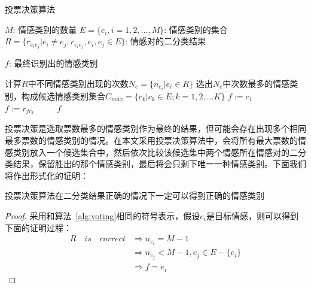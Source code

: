 \begin{algorithm}[H]
    \caption{投票决策算法}
    \label{alg:voting}
    
    \begin{algorithmic}[1]
        \Require %
            \Statex $M$: 情感类别的数量 
            \Statex $E = \{e_i, i=1,2,...,M\}$: 情感类别的集合
            \Statex $R = \{r_{e_ie_j}|e_i \neq e_j; r_{e_ie_j}, e_i, e_j \in E\}$: 情感对的二分类结果

        \Ensure %
            \Statex $f$: 最终识别出的情感类别

        \Statex
        \State  计算$R$中不同情感类别出现的次数$N_e = \{n_{e_i}|e_i \in R\}$ %
        \State  选出$N_e$中次数最多的情感类别，构成候选情感类别集合$C_{max} = \{c_k|c_k \in E; k = 1,2,...K\}$
        \State  $f := c_1$
                \State $f := r_{fc_k}$
            \EndFor
    　　 \EndIf
        \State \Return $f$
    \end{algorithmic}
\end{algorithm}

投票决策是选取票数最多的情感类别作为最终的结果，但可能会存在出现多个相同最多票数的情感类别的情况。在本文采用投票决策算法中，会将所有最大票数的情感类别放入一个候选集合中，然后依次比较该候选集中两个情感所在情感对的二分类结果，保留胜出的那个情感类别，最后将会只剩下唯一一种情感类别。下面我们将作出形式化的证明：

\begin{proposition}
    投票决策算法在二分类结果正确的情况下一定可以得到正确的情感类别
\end{proposition}
\begin{proof}
    采用和算法~\ref{alg:voting}相同的符号表示，假设$e_i$是目标情感，则可以得到下面的证明过程：
    \[
        \begin{aligned}
            R \quad is \quad correct &\Rightarrow n_{e_i} = M - 1 \\
            &\Rightarrow n_{e_j} < M - 1, e_j \in E - \{e_i\} \\
            &\Rightarrow f = e_i
        \end{aligned}
    \]
\end{proof}

